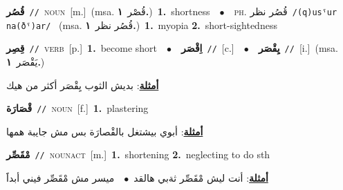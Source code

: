 \documentclass[10pt,a4paper,twoside]{article} %
\begin{document}
\begin{multicols}{2}
{\setlength\topsep{0pt}\textbf{\foreignlanguage{arabic}{قُصُر}}\ {\color{gray}\texttt{//}\color{black}}\ \textsc{noun}\ [m.]\ \color{gray}(msa. \foreignlanguage{arabic}{قُصْر}~\foreignlanguage{arabic}{\textbf{١.}})\color{black}\ \textbf{1.}~shortness\ \ $\bullet$\ \ \textsc{ph.} \color{gray} \foreignlanguage{arabic}{قُصُر نظر}\color{black}\ {\color{gray}\texttt{/{\sffamily (q)usˤur na(ðˤ)ar}/}\color{black}}\ \color{gray} (msa. \foreignlanguage{arabic}{قُصُر نظر}~\foreignlanguage{arabic}{\textbf{١.}})\color{black}\ \textbf{1.}~myopia  \textbf{2.}~short-sightedness\ } \vspace{2mm}

{\setlength\topsep{0pt}\textbf{\foreignlanguage{arabic}{قِصِر}}\ {\color{gray}\texttt{//}\color{black}}\ \textsc{verb}\ [p.]\ \textbf{1.}~become short\ \ $\bullet$\ \ \setlength\topsep{0pt}\textbf{\foreignlanguage{arabic}{اِقْصَر}}\ {\color{gray}\texttt{//}\color{black}}\ [c.]\ \ $\bullet$\ \ \setlength\topsep{0pt}\textbf{\foreignlanguage{arabic}{يِقْصَر}}\ {\color{gray}\texttt{//}\color{black}}\ [i.]\ \color{gray}(msa. \foreignlanguage{arabic}{يَقْصَر}~\foreignlanguage{arabic}{\textbf{١.}})\color{black}\  \begin{flushright}\color{gray}\foreignlanguage{arabic}{\textbf{\underline{\foreignlanguage{arabic}{أمثلة}}}: بديش الثوب يِقْصَر أكثر من هيك}\end{flushright}\color{black}} \vspace{2mm}

{\setlength\topsep{0pt}\textbf{\foreignlanguage{arabic}{قْصَارَة}}\ {\color{gray}\texttt{//}\color{black}}\ \textsc{noun}\ [f.]\ \textbf{1.}~plastering\  \begin{flushright}\color{gray}\foreignlanguage{arabic}{\textbf{\underline{\foreignlanguage{arabic}{أمثلة}}}: أبوي بيشتغل بالقْصارَة بس مش جايبة همها}\end{flushright}\color{black}} \vspace{2mm}

{\setlength\topsep{0pt}\textbf{\foreignlanguage{arabic}{مْقَصِّر}}\ {\color{gray}\texttt{//}\color{black}}\ \textsc{noun\textunderscore act}\ [m.]\ \textbf{1.}~shortening  \textbf{2.}~neglecting to do sth\  \begin{flushright}\color{gray}\foreignlanguage{arabic}{\textbf{\underline{\foreignlanguage{arabic}{أمثلة}}}: أنت ليش مْقَصِّر ثةبي هالقد\ $\bullet$\ \  ميسر مش مْقَصِّر فيني أبداََ}\end{flushright}\color{black}} \vspace{2mm}


\end{multicols}
\end{document}
